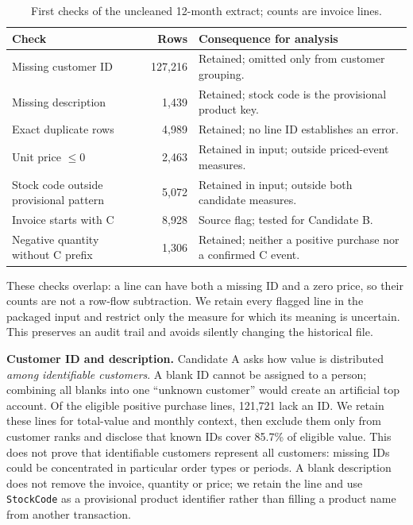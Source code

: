 \documentclass[10pt,a4paper]{article}
\newcommand{\subhead}[1]{\vspace{0.18em}{\bfseries #1}\par}
\begin{document}
\begin{table}[H]\centering\small
\caption{First checks of the uncleaned 12-month extract; counts are invoice lines.}
\begin{tabularx}{\linewidth}{@{}>{\raggedright\arraybackslash}Xr>{\raggedright\arraybackslash}X@{}}\toprule
Check & Rows & Consequence for analysis \\\midrule
Missing customer ID & 127,216 & Retained; omitted only from customer grouping. \\
Missing description & 1,439 & Retained; stock code is the provisional product key. \\
Exact duplicate rows & 4,989 & Retained; no line ID establishes an error. \\
Unit price $\leq 0$ & 2,463 & Retained in input; outside priced-event measures. \\
Stock code outside provisional pattern & 5,072 & Retained in input; outside both candidate measures. \\
Invoice starts with C & 8,928 & Source flag; tested for Candidate B. \\
Negative quantity without C prefix & 1,306 & Retained; neither a positive purchase nor a confirmed C event. \\
\bottomrule\end{tabularx}
\end{table}

These checks overlap: a line can have both a missing ID and a zero price, so their counts are not a row-flow subtraction. We retain every flagged line in the packaged input and restrict only the measure for which its meaning is uncertain. This preserves an audit trail and avoids silently changing the historical file.

\subhead{Why each treatment fits the proposed decisions}
\textbf{Customer ID and description.} Candidate A asks how value is distributed \emph{among identifiable customers}. A blank ID cannot be assigned to a person; combining all blanks into one ``unknown customer'' would create an artificial top account. Of the eligible positive purchase lines, 121,721 lack an ID. We retain these lines for total-value and monthly context, then exclude them only from customer ranks and disclose that known IDs cover 85.7\% of eligible value. This does not prove that identifiable customers represent all customers: missing IDs could be concentrated in particular order types or periods. A blank description does not remove the invoice, quantity or price; we retain the line and use \texttt{StockCode} as a provisional product identifier rather than filling a product name from another transaction.
\end{document}
